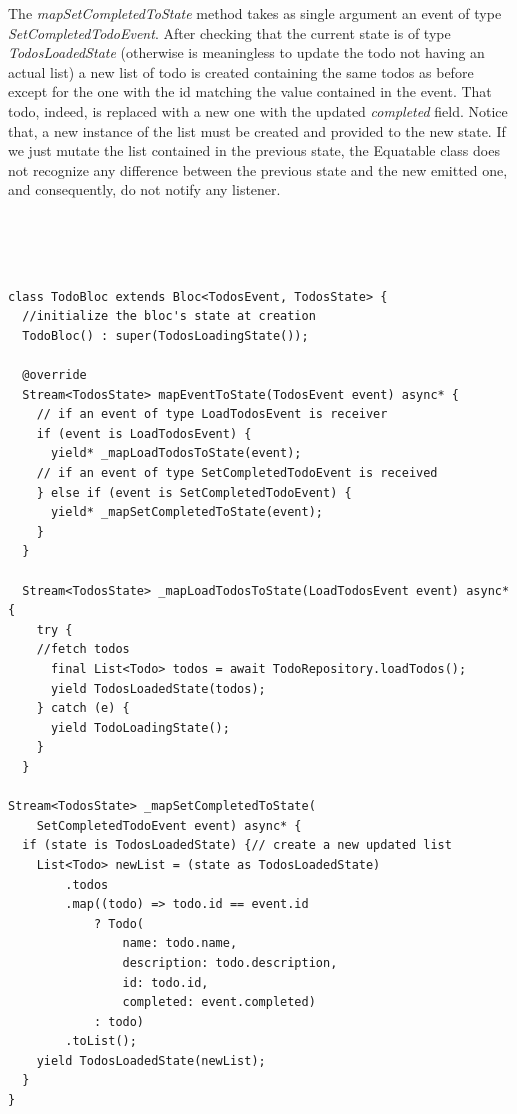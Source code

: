 The \textit{mapSetCompletedToState} method takes as single argument an event of type \textit{SetCompletedTodoEvent}. After checking that the current state is of type \textit{TodosLoadedState} (otherwise is meaningless to update the todo not having an actual list) a new list of todo is created containing the same todos as before except for the one with the id matching the value contained in the event. That todo, indeed, is replaced with a new one with the updated \textit{completed} field. Notice that, a new instance of the list must be created and provided to the new state. If we just mutate the list contained in the previous state, the Equatable class does not recognize any difference between the previous state and the new emitted one, and consequently, do not notify any listener. 
\begin{code}
\mbox{}\\
 \mbox{}
\label{code:2.14}
\begin{verbatim}


class TodoBloc extends Bloc<TodosEvent, TodosState> {
  //initialize the bloc's state at creation
  TodoBloc() : super(TodosLoadingState());

  @override
  Stream<TodosState> mapEventToState(TodosEvent event) async* {
    // if an event of type LoadTodosEvent is receiver
    if (event is LoadTodosEvent) { 
      yield* _mapLoadTodosToState(event);
    // if an event of type SetCompletedTodoEvent is received
    } else if (event is SetCompletedTodoEvent) {
      yield* _mapSetCompletedToState(event);
    } 
  }

  Stream<TodosState> _mapLoadTodosToState(LoadTodosEvent event) async* {
    try {
    //fetch todos
      final List<Todo> todos = await TodoRepository.loadTodos();
      yield TodosLoadedState(todos);
    } catch (e) {
      yield TodoLoadingState();
    }
  }

Stream<TodosState> _mapSetCompletedToState(
    SetCompletedTodoEvent event) async* {
  if (state is TodosLoadedState) {// create a new updated list
    List<Todo> newList = (state as TodosLoadedState)
        .todos
        .map((todo) => todo.id == event.id
            ? Todo(
                name: todo.name,
                description: todo.description,
                id: todo.id,
                completed: event.completed)
            : todo)
        .toList();
    yield TodosLoadedState(newList);
  }
}


\end{verbatim}
\mbox{}
\end{code}
